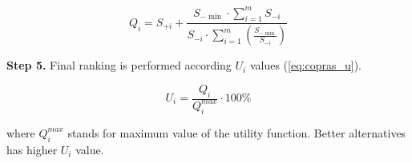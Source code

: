\begin{equation}
    \label{eq:copras_q}
    Q_{i}=S_{+i}+\frac{S_{-\min } \cdot \sum_{i=1}^{m} S_{-i}}{S_{-i} \cdot \sum_{i=1}^{m}\left(\frac{S_{-\min }}{S_{-i}}\right)}
\label{eq:copras_q}
\end{equation}

\noindent \textbf{Step 5.} Final ranking is performed according $U_i$ values (\ref{eq:copras_u}).

\begin{equation}
    U_i = \frac{Q_i}{Q^{max}_i} \cdot 100\%
\end{equation}
\label{eq:copras_u}

where $Q^{max}_i$ stands for maximum value of the utility function. Better alternatives has higher $U_i$
value.
